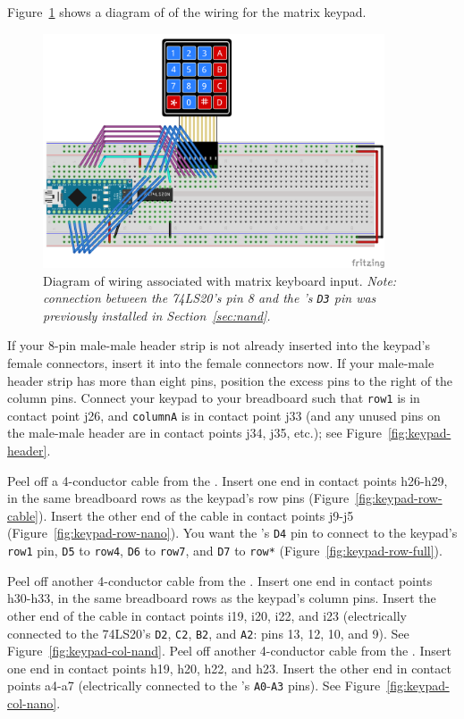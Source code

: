 Figure~\ref{fig:keypad-diagram} shows a diagram of of the wiring for the
matrix keypad.

\begin{figure}[p]
    \centering
    \includegraphics[width=0.9\textwidth]{fritzing_images/keypad}
    \caption{Diagram of wiring associated with matrix keyboard input.
        \textit{Note: connection between the 74LS20's pin 8 and the \nano's
        \texttt{D3} pin was previously installed in Section~\ref{sec:nand}.}
        \label{fig:keypad-diagram}}
\end{figure}

If your 8-pin male-male header strip is not already inserted into the keypad's
female connectors, insert it into the female connectors now. If your male-male
header strip has more than eight pins, position the excess pins to the right of
the column pins. Connect your keypad to your breadboard such that \texttt{row1}
is in contact point j26, and \texttt{columnA} is in contact point j33 (and any
unused pins on the male-male header are in contact points j34, j35, etc.); see
Figure~\ref{fig:keypad-header}.

Peel off a 4-conductor cable from the \rainbow. Insert one end in contact
points h26-h29, in the same breadboard rows as the keypad's row pins
(Figure~\ref{fig:keypad-row-cable}). Insert the other end of the cable in
contact points j9-j5 (Figure~\ref{fig:keypad-row-nano}). You want the \nano's
\texttt{D4} pin to connect to the keypad's \texttt{row1} pin, \texttt{D5} to
\texttt{row4}, \texttt{D6} to \texttt{row7}, and \texttt{D7} to \texttt{row*}
(Figure~\ref{fig:keypad-row-full}).

Peel off another 4-conductor cable from the \rainbow. Insert one end in contact
points h30-h33, in the same breadboard rows as the keypad's column pins. Insert
the other end of the cable in contact points i19, i20, i22, and i23
(electrically connected to the 74LS20's \texttt{D2}, \texttt{C2}, \texttt{B2},
and \texttt{A2}: pins 13, 12, 10, and 9). See
Figure~\ref{fig:keypad-col-nand}. Peel off another 4-conductor cable from
the \rainbow. Insert one end in contact points h19, h20, h22, and h23. Insert
the other end in contact points a4-a7 (electrically connected to the \nano's
\texttt{A0}-\texttt{A3} pins). See Figure~\ref{fig:keypad-col-nano}.

